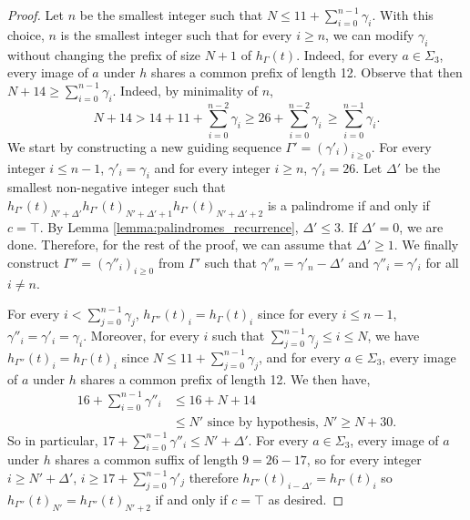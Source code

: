 \documentclass[12pt]{article}
\theoremstyle{definition}
\begin{document}
\begin{proof}
    Let $n$ be the smallest integer such that $N \leq 11 + \sum_{i = 0}^{n - 1}\gamma_i$. With this choice, $n$ is the smallest integer such that for every $i \geq n$, we can modify $\gamma_i$ without changing the prefix of size $N + 1$ of $h_\Gamma(t)$. Indeed, for every $a \in \Sigma_3$, every image of $a$ under $h$ shares a common prefix of length 12. Observe that then $N + 14 \geq \sum_{i = 0}^{n - 1}\gamma_i$. Indeed, by minimality of $n$,
    \begin{equation*}
    N+14 > 14+11 + \sum_{i = 0}^{n - 2} \gamma_i 
    \ge 26 + \sum_{i = 0}^{n - 2} \gamma_i\,
    \geq \sum_{i = 0}^{n - 1} \gamma_i.
    \end{equation*}
    We start by constructing a new guiding sequence $\Gamma' = (\gamma'_i)_{i \geq 0}$. For every integer $i \leq n - 1$, $\gamma'_i = \gamma_i$ and for every integer $i \geq n$, $\gamma'_i = 26$. Let $\Delta'$ be the smallest non-negative integer such that $h_{\Gamma'}(t)_{N' + \Delta'}h_{\Gamma'}(t)_{N' + \Delta' + 1}h_{\Gamma'}(t)_{N' + \Delta' + 2}$ is a palindrome if and only if $c = \top$. By Lemma \ref{lemma:palindromes_recurrence}, $\Delta' \leq 3$. If $\Delta' = 0$, we are done. Therefore, for the rest of the proof, we can assume that $\Delta' \geq 1$. We finally construct $\Gamma'' = (\gamma''_i)_{i \ge 0}$ from $\Gamma'$ such that $\gamma''_n = \gamma'_n - \Delta'$ and $\gamma''_i = \gamma'_i$ for all $i\neq n$. 
    
     For every $i < \sum_{j = 0}^{n - 1} \gamma_j$, $h_{\Gamma''}(t)_i = h_\Gamma(t)_i$ since for every $i \leq n - 1$, $\gamma''_i = \gamma'_i=\gamma_i$. Moreover, for every $i$ such that $\sum_{j = 0}^{n - 1} \gamma_j\le i\le N$, we have $h_{\Gamma''}(t)_i = h_\Gamma(t)_i$ since $N \leq 11 + \sum_{j = 0}^{n - 1} \gamma_j$, and for every $a \in \Sigma_3$, every image of $a$ under $h$ shares a common prefix of length 12. We then have,
    \begin{align*}
        16 + \sum_{i = 0}^{n - 1} \gamma''_i    &\leq 16 + N + 14\\
                                                &\leq N' \textrm{ since by hypothesis, } N' \geq N + 30.
    \end{align*}
    So in particular, $17 + \sum_{i = 0}^{n - 1} \gamma''_i \le N' + \Delta'$. For every $a \in \Sigma_3$, every image of $a$ under $h$ shares a common suffix of length $9 = 26 - 17$, so for every integer $i \geq N' + \Delta'$, $i \geq 17 + \sum_{j = 0}^{n - 1}\gamma'_j$ therefore $h_{\Gamma''}(t)_{i - \Delta'} = h_{\Gamma'}(t)_{i}$ so $h_{\Gamma''}(t)_{N'} = h_{\Gamma''}(t)_{N' + 2}$ if and only if $c = \top$ as desired.
\end{proof}
\end{document}
